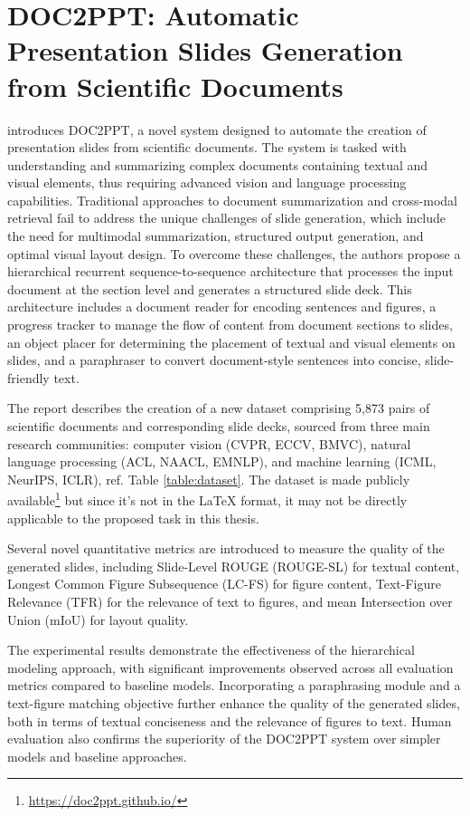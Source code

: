 \section{DOC2PPT: Automatic Presentation Slides Generation from Scientific Documents}

\citet{Fu:2022:AAAI} introduces DOC2PPT, a novel system designed to automate the creation of presentation slides from scientific documents. The system is tasked with understanding and summarizing complex documents containing textual and visual elements, thus requiring advanced vision and language processing capabilities. Traditional approaches to document summarization and cross-modal retrieval fail to address the unique challenges of slide generation, which include the need for multimodal summarization, structured output generation, and optimal visual layout design. To overcome these challenges, the authors propose a hierarchical recurrent sequence-to-sequence architecture that processes the input document at the section level and generates a structured slide deck. This architecture includes a document reader for encoding sentences and figures, a progress tracker to manage the flow of content from document sections to slides, an object placer for determining the placement of textual and visual elements on slides, and a paraphraser to convert document-style sentences into concise, slide-friendly text.

The report describes the creation of a new dataset comprising 5,873 pairs of scientific documents and corresponding slide decks, sourced from three main research communities: computer vision (CVPR, ECCV, BMVC), natural language processing (ACL, NAACL, EMNLP), and machine learning (ICML, NeurIPS, ICLR), ref. Table \ref{table:dataset}. The dataset is made publicly available\footnote{\url{https://doc2ppt.github.io/}} but since it's not in the \LaTeX{} format, it may not be directly applicable to the proposed task in this thesis. 

Several novel quantitative metrics are introduced to measure the quality of the generated slides, including Slide-Level ROUGE (ROUGE-SL) for textual content, Longest Common Figure Subsequence (LC-FS) for figure content, Text-Figure Relevance (TFR) for the relevance of text to figures, and mean Intersection over Union (mIoU) for layout quality.

The experimental results demonstrate the effectiveness of the hierarchical modeling approach, with significant improvements observed across all evaluation metrics compared to baseline models. Incorporating a paraphrasing module and a text-figure matching objective further enhance the quality of the generated slides, both in terms of textual conciseness and the relevance of figures to text. Human evaluation also confirms the superiority of the DOC2PPT system over simpler models and baseline approaches.

